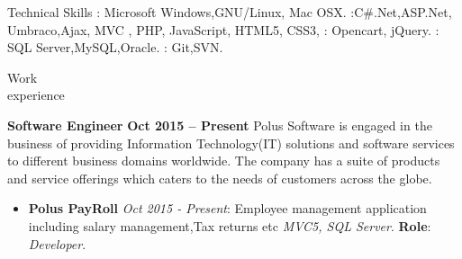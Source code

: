 \documentclass{resume}
\author{Babin Babu}
\begin{document}
\maketitle


\begin{category}{Technical Skills}
  :  Microsoft Windows,GNU/Linux, Mac OSX.
  :C#.Net,ASP.Net, Umbraco,Ajax, MVC , PHP, JavaScript, HTML5, CSS3,
  : Opencart, jQuery.
  : SQL Server,MySQL,Oracle.
  : Git,SVN.
\end{category}


\begin{category}{Work \\experience}

  \citemnobullet \textbf{Software Engineer} \hfill \textbf{Oct 2015 -- Present }
  \citemnobullet Polus Software is engaged in the business of  providing Information Technology(IT) solutions and software services to different business domains worldwide. The company has a suite of products and service offerings which caters to the needs of customers across the globe. 
\begin{itemize}
  \item \textbf{Polus PayRoll} {\em Oct 2015 - Present}: Employee management application including salary management,Tax returns etc {\em MVC5,  SQL Server}. \textbf{Role}: {\em Developer}.
    \end{itemize}
    

\end{category}
\end{document}
